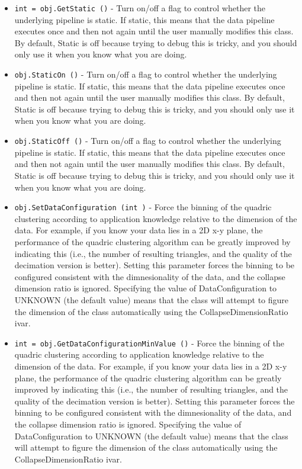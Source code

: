\begin{itemize}
\item  \verb|int = obj.GetStatic ()| -  Turn on/off a flag to control whether the underlying pipeline is static.
 If static, this means that the data pipeline executes once and then not 
 again until the user manually modifies this class. By default, Static is
 off because trying to debug this is tricky, and you should only use it
 when you know what you are doing.

\item  \verb|obj.StaticOn ()| -  Turn on/off a flag to control whether the underlying pipeline is static.
 If static, this means that the data pipeline executes once and then not 
 again until the user manually modifies this class. By default, Static is
 off because trying to debug this is tricky, and you should only use it
 when you know what you are doing.

\item  \verb|obj.StaticOff ()| -  Turn on/off a flag to control whether the underlying pipeline is static.
 If static, this means that the data pipeline executes once and then not 
 again until the user manually modifies this class. By default, Static is
 off because trying to debug this is tricky, and you should only use it
 when you know what you are doing.

\item  \verb|obj.SetDataConfiguration (int )| -  Force the binning of the quadric clustering according to application
 knowledge relative to the dimension of the data. For example, if you
 know your data lies in a 2D x-y plane, the performance of the quadric
 clustering algorithm can be greatly improved by indicating this (i.e.,
 the number of resulting triangles, and the quality of the decimation
 version is better). Setting this parameter forces the binning to be
 configured consistent with the dimnesionality of the data, and the
 collapse dimension ratio is ignored. Specifying the value of
 DataConfiguration to UNKNOWN (the default value) means that the class
 will attempt to figure the dimension of the class automatically using
 the CollapseDimensionRatio ivar.

\item  \verb|int = obj.GetDataConfigurationMinValue ()| -  Force the binning of the quadric clustering according to application
 knowledge relative to the dimension of the data. For example, if you
 know your data lies in a 2D x-y plane, the performance of the quadric
 clustering algorithm can be greatly improved by indicating this (i.e.,
 the number of resulting triangles, and the quality of the decimation
 version is better). Setting this parameter forces the binning to be
 configured consistent with the dimnesionality of the data, and the
 collapse dimension ratio is ignored. Specifying the value of
 DataConfiguration to UNKNOWN (the default value) means that the class
 will attempt to figure the dimension of the class automatically using
 the CollapseDimensionRatio ivar.


\end{itemize}
